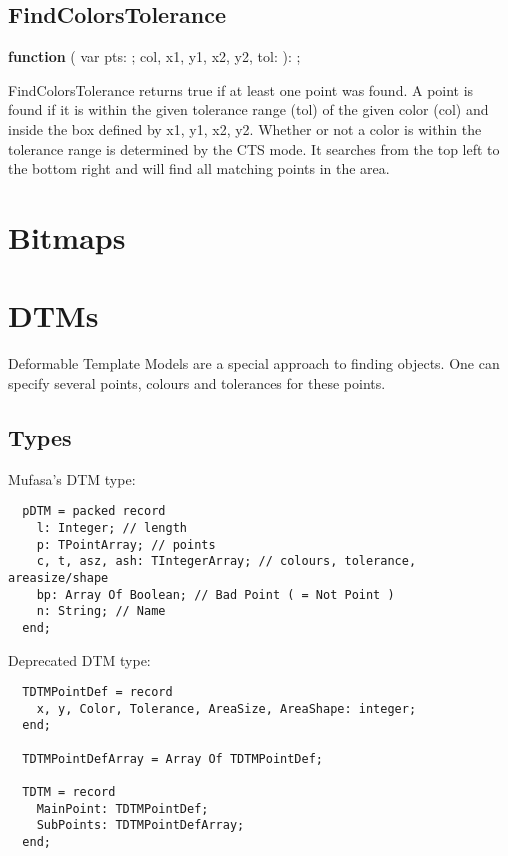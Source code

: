 \documentclass[a4paper]{report}
\begin{document}
\subsection{FindColorsTolerance}

\textbf{function} {\color{blue}{FindColorsTolerance}}({\color{typeRed}
{var pts: }}{\color{typeGreen}{TPointArray}}; {\color{typeRed}
{col, x1, y1, x2, y2, tol: }}{\color{typeGreen}{Integer}}): {\color{typeGreen}{Boolean}};

FindColorsTolerance returns true if at least one point was found. A point is found if it is within the
given tolerance range (tol) of the given color (col) and inside the box defined by x1, y1, x2, y2.
Whether or not a color is within the tolerance range is determined by the CTS mode.
It searches from the top left to the bottom right and will find all matching points in the area.

\section{Bitmaps}


\section{DTMs}

Deformable Template Models are a special approach to finding
objects. One can specify several points, colours and tolerances
for these points.

\subsection{Types}

Mufasa's DTM type:

\begin{verbatim}
  pDTM = packed record
    l: Integer; // length
    p: TPointArray; // points
    c, t, asz, ash: TIntegerArray; // colours, tolerance, areasize/shape
    bp: Array Of Boolean; // Bad Point ( = Not Point )
    n: String; // Name
  end;              
\end{verbatim}

Deprecated DTM type:

\begin{verbatim}
  TDTMPointDef = record
    x, y, Color, Tolerance, AreaSize, AreaShape: integer;
  end;

  TDTMPointDefArray = Array Of TDTMPointDef;

  TDTM = record
    MainPoint: TDTMPointDef;
    SubPoints: TDTMPointDefArray;
  end;    
\end{verbatim}
\end{document}
